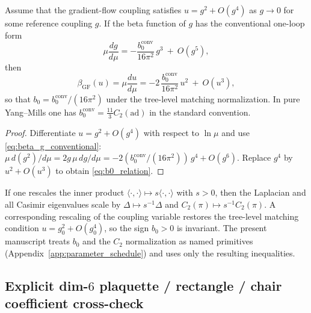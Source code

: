 \begin{lemma}
\label{lem:b0_one_loop_match}
Assume that the gradient-flow coupling satisfies
$u=g^2+O(g^4)$ as $g\to 0$ for some reference coupling $g$.
If the beta function of $g$ has the conventional one-loop form
\begin{equation}
\label{eq:beta_g_conventional}
\mu\frac{dg}{d\mu}= -\frac{b_0^{\mathrm{conv}}}{16\pi^2}\,g^3\ +\ O(g^5),
\end{equation}
then
\begin{equation}
\label{eq:b0_relation}
\beta_{\mathrm{GF}}(u)=\mu\frac{du}{d\mu}= -2\,\frac{b_0^{\mathrm{conv}}}{16\pi^2}\,u^2\ +\ O(u^3),
\end{equation}
so that $b_0=b_0^{\mathrm{conv}}/(16\pi^2)$ under the tree-level matching normalization.
In pure Yang--Mills one has $b_0^{\mathrm{conv}}=\frac{11}{3}C_2(\mathrm{ad})$ in the standard convention.
\end{lemma}

\begin{proof}
Differentiate $u=g^2+O(g^4)$ with respect to $\ln\mu$ and use \eqref{eq:beta_g_conventional}:
$\mu\,d(g^2)/d\mu = 2g\,\mu\,dg/d\mu = -2(b_0^{\mathrm{conv}}/(16\pi^2))\,g^4+O(g^6)$.
Replace $g^4$ by $u^2+O(u^3)$ to obtain \eqref{eq:b0_relation}.
\end{proof}

\begin{remark}
If one rescales the inner product $\langle\cdot,\cdot\rangle\mapsto s\langle\cdot,\cdot\rangle$ with $s>0$, then the Laplacian
and all Casimir eigenvalues scale by $\Delta\mapsto s^{-1}\Delta$ and $C_2(\pi)\mapsto s^{-1}C_2(\pi)$.
A corresponding rescaling of the coupling variable restores the tree-level matching condition $u=g_0^2+O(g_0^4)$, so the sign $b_0>0$ is invariant.
The present manuscript treats $b_0$ and the $C_2$ normalization as named primitives (Appendix~\ref{app:parameter_schedule}) and uses only the resulting inequalities.
\end{remark}


\subsection{Explicit dim-$6$ plaquette / rectangle / chair coefficient cross-check}

